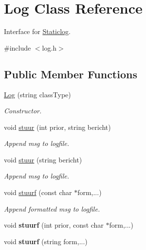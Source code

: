 \hypertarget{class_log}{\section{Log Class Reference}
\label{class_log}
}


Interface for \hyperlink{class_staticlog}{Staticlog}.  




{\ttfamily \#include $<$log.\-h$>$}

\subsection*{Public Member Functions}
\begin{DoxyCompactItemize}
\item 
\hyperlink{class_log_aafedd292687728b93366ccd4ad90db58}{Log} (string class\-Type)
\begin{DoxyCompactList}\small\item\em Constructor. \end{DoxyCompactList}\item 
void \hyperlink{class_log_a76964f632ca5c006564bc4a1558e397d}{stuur} (int prior, string bericht)
\begin{DoxyCompactList}\small\item\em Append msg to logfile. \end{DoxyCompactList}\item 
void \hyperlink{class_log_a2d00b909358b60805687052ff0da9787}{stuur} (string bericht)
\begin{DoxyCompactList}\small\item\em Append msg to logfile. \end{DoxyCompactList}\item 
void \hyperlink{class_log_a7daac41360c529bab22694f2c4831b61}{stuurf} (const char $\ast$form,...)
\begin{DoxyCompactList}\small\item\em Append formatted msg to logfile. \end{DoxyCompactList}\item 
\hypertarget{class_log_abb994c92ce01a8f95d6946783f8bf4b2}{void {\bfseries stuurf} (int prior, const char $\ast$form,...)}\label{class_log_abb994c92ce01a8f95d6946783f8bf4b2}

\item 
\hypertarget{class_log_ab86c2425cc5702eaed5439e2564450a3}{void {\bfseries stuurf} (string form,...)}\label{class_log_ab86c2425cc5702eaed5439e2564450a3}


\end{DoxyCompactItemize}
